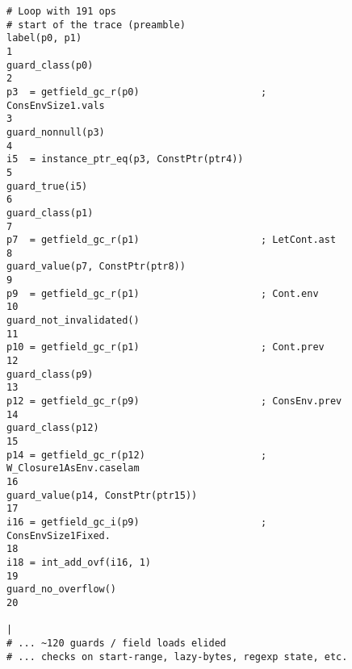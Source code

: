 \begin{figure}[!htbp]
	\centering

\begin{lstlisting}[style=rptrace-style]
# Loop with 191 ops
# start of the trace (preamble)
label(p0, p1)                                                                                                1
guard_class(p0)                                                                                              2
p3  = getfield_gc_r(p0)                     ; ConsEnvSize1.vals                                              3
guard_nonnull(p3)                                                                                            4
i5  = instance_ptr_eq(p3, ConstPtr(ptr4))                                                                    5
guard_true(i5)                                                                                               6
guard_class(p1)                                                                                              7
p7  = getfield_gc_r(p1)                     ; LetCont.ast                                                    8
guard_value(p7, ConstPtr(ptr8))                                                                              9
p9  = getfield_gc_r(p1)                     ; Cont.env                                                       10
guard_not_invalidated()                                                                                      11
p10 = getfield_gc_r(p1)                     ; Cont.prev                                                      12
guard_class(p9)                                                                                              13
p12 = getfield_gc_r(p9)                     ; ConsEnv.prev                                                   14
guard_class(p12)                                                                                             15
p14 = getfield_gc_r(p12)                    ; W_Closure1AsEnv.caselam                                        16
guard_value(p14, ConstPtr(ptr15))                                                                            17
i16 = getfield_gc_i(p9)                     ; ConsEnvSize1Fixed.                                             18
i18 = int_add_ovf(i16, 1)                                                                                    19
guard_no_overflow()                                                                                          20
                                                                                                             |
# ... ~120 guards / field loads elided
# ... checks on start-range, lazy-bytes, regexp state, etc.


\end{lstlisting}
\end{figure}

